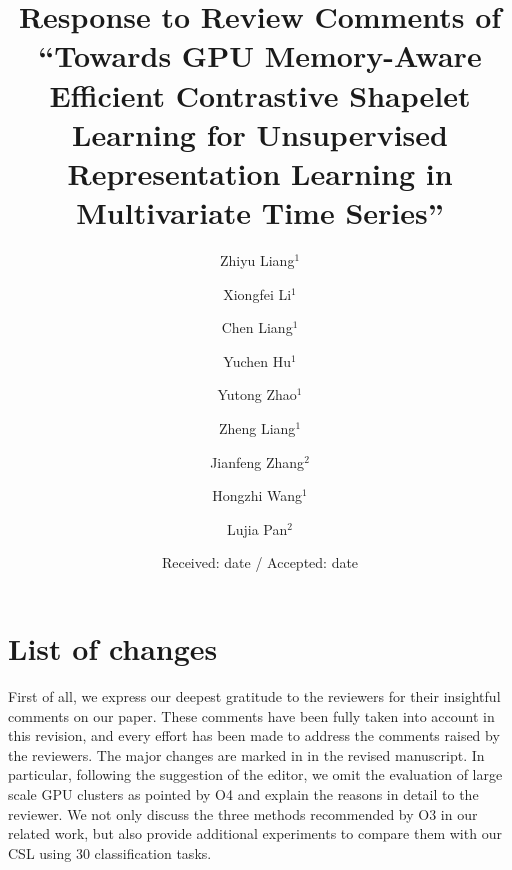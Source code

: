 \begin{sloppypar}
\title{Response to Review Comments of ``Towards GPU Memory-Aware Efficient Contrastive Shapelet Learning for Unsupervised Representation Learning in Multivariate Time Series''%
}


\author{Zhiyu Liang$^1$         \and
        Xiongfei Li$^1$ \and Chen Liang$^1$ \and Yuchen Hu$^1$ \and Yutong Zhao$^1$ \and Zheng Liang$^1$ \and Jianfeng Zhang$^2$ \and Hongzhi Wang$^{1}$ \and Lujia Pan$^2$   %
}



\date{Received: date / Accepted: date}


\maketitle

\section{List of changes}

First of all, we express our deepest gratitude to the reviewers for their insightful
comments on our paper. These comments have been fully taken into
account in this revision, and every effort has been made to address the comments
raised by the reviewers. The major changes are marked in  in the
revised manuscript. In particular, following the suggestion of the editor, we omit the evaluation of large scale GPU clusters as pointed by O4 and explain the reasons in detail to the reviewer. We not only discuss the three methods recommended by O3 in our related work, but also provide additional experiments to compare them with our CSL using 30 classification tasks.


\end{sloppypar}
